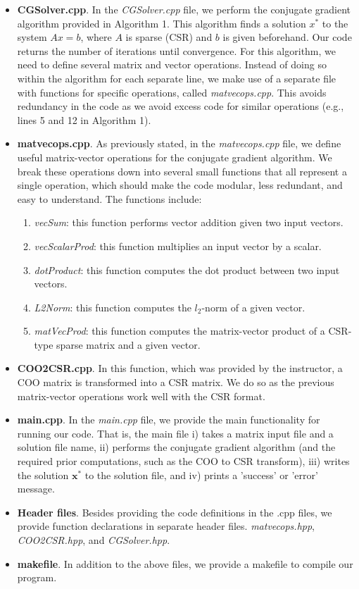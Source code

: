 \documentclass[12pt, a4paper]{article}
\begin{document}
\begin{itemize}
    \item \textbf{CGSolver.cpp}. In the \textit{CGSolver.cpp} file, we perform 
    the  conjugate gradient algorithm provided in Algorithm 1. 
    This algorithm finds a solution $x^*$ to the system $Ax = b$, where $A$ is 
    sparse (CSR) and $b$ is given beforehand. Our code returns the number 
    of iterations until convergence. For this algorithm, we need to define
    several matrix and vector operations. Instead of doing so within the
    algorithm for each separate line, we make use of a separate file
    with functions for specific operations, called \textit{matvecops.cpp}.
    This avoids redundancy in the code as we avoid excess code for similar
    operations (e.g., lines 5 and 12 in Algorithm 1).
    \item \textbf{matvecops.cpp}. As previously stated, in the 
    \textit{matvecops.cpp} file, we define useful
    matrix-vector operations for the conjugate gradient algorithm. 
    We break these operations down into several small functions that all 
    represent a single operation, which should make the code modular,
    less redundant, and easy to understand. The functions include:
        \begin{enumerate}
            \item \textit{vecSum}: this function performs vector addition 
            given two input vectors.
            \item \textit{vecScalarProd}: this function multiplies an input
            vector by a scalar.
            \item \textit{dotProduct}: this function computes the dot product
            between two input vectors.
            \item \textit{L2Norm}: this function computes the $l_2$-norm of
            a given vector.
            \item \textit{matVecProd}: this function computes the matrix-vector
            product of a CSR-type sparse matrix and a given vector.
        \end{enumerate}
    \item \textbf{COO2CSR.cpp}. In this function, which was provided by the 
    instructor, a COO matrix is transformed into a CSR matrix. We do so as
    the previous matrix-vector operations work well with the CSR format.
    \item \textbf{main.cpp}. In the \textit{main.cpp} file, we provide the 
    main functionality for running our code. That is, the main file i) takes 
    a matrix input file and a solution file name, ii) performs the conjugate 
    gradient algorithm (and the required prior computations, such as the COO 
    to CSR transform), iii) writes the solution $\mathbf{x}^*$ to 
    the solution file, and iv) prints a 'success' or 'error' message.
    \item \textbf{Header files}. Besides providing the code definitions in 
    the .cpp files, we provide function declarations in separate header files. 
    \textit{matvecops.hpp}, \textit{COO2CSR.hpp}, and \textit{CGSolver.hpp}.
    \item \textbf{makefile}. In addition to the above files, we provide a 
    makefile to compile our program.
\end{itemize}
\end{document}
